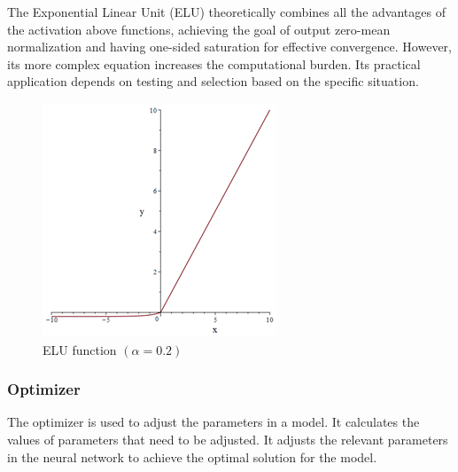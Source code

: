 \documentclass[10pt,journal,compsoc]{IEEEtran}
\begin{document}
\begin{enumerate}
The Exponential Linear Unit (ELU) theoretically combines all the advantages of the activation above functions, achieving the goal of output zero-mean normalization and having one-sided saturation for effective convergence. However, its more complex equation increases the computational burden. Its practical application depends on testing and selection based on the specific situation.

\begin{figure}
    \centering
    \includegraphics[scale=0.6] {PNG/2-7.png}
    \caption{ELU function $(\alpha = 0.2)$}
    \label{fig:2-7}
\end{figure}

\end{enumerate}

\subsubsection{Optimizer}

The optimizer is used to adjust the parameters in a model. It calculates the values of parameters that need to be adjusted. It adjusts the relevant parameters in the neural network to achieve the optimal solution for the model.
\end{document}
